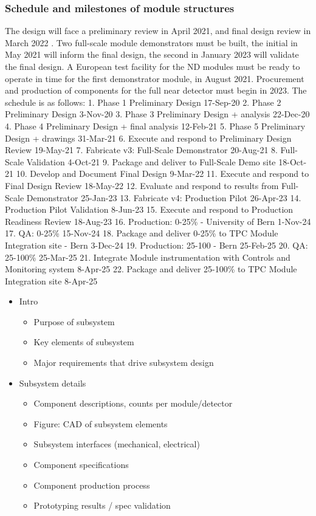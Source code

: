 \subsubsection{Schedule and milestones of module structures}
The design will face a preliminary review in April 2021, and final design review in March 2022 . Two full-scale module demonstrators must be built, the initial in May 2021 will inform the final design, the second in January 2023 will validate the final design. A European test facility for the ND modules must be ready to operate in time for the first demonstrator module, in August 2021. Procurement and production of components for the full near detector must begin in 2023. The schedule is as follows:
    1. Phase 1 Preliminary Design 17-Sep-20
    2. Phase 2 Preliminary Design 3-Nov-20
    3. Phase 3 Preliminary Design + analysis 22-Dec-20
    4. Phase 4 Preliminary Design + final analysis 12-Feb-21
    5. Phase 5 Preliminary Design + drawings 31-Mar-21
    6. Execute and respond to Preliminary Design Review 19-May-21
    7. Fabricate v3: Full-Scale Demonstrator 20-Aug-21
    8. Full-Scale Validation 4-Oct-21
    9. Package and deliver to Full-Scale Demo site 18-Oct-21
    10. Develop and Document Final Design 9-Mar-22
    11. Execute and respond to Final Design Review 18-May-22
    12. Evaluate and respond to results from Full-Scale Demonstrator 25-Jan-23
    13. Fabricate v4: Production Pilot 26-Apr-23
    14. Production Pilot Validation 8-Jun-23
    15. Execute and respond to Production Readiness Review 18-Aug-23
    16. Production: 0-25\% - University of Bern 1-Nov-24
    17. QA: 0-25\% 15-Nov-24
    18. Package and deliver 0-25\% to TPC Module Integration site - Bern 3-Dec-24
    19. Production: 25-100 - Bern 25-Feb-25
    20. QA: 25-100\% 25-Mar-25
    21. Integrate Module instrumentation with Controls and Monitoring system 8-Apr-25
    22. Package and deliver 25-100\% to TPC Module Integration site 8-Apr-25


\begin{itemize}
    \item Intro 
    \begin{itemize}
        \item Purpose of subsystem
        \item Key elements of subsystem
        \item Major requirements that drive subsystem design
    \end{itemize}
    \item Subsystem details
    \begin{itemize}
        \item Component descriptions, counts per module/detector
        \item Figure: CAD of subsystem elements
        \item Subsystem interfaces (mechanical, electrical)
        \item Component specifications
        \item Component production process
        \item Prototyping results / spec validation
    \end{itemize}
\end{itemize}

